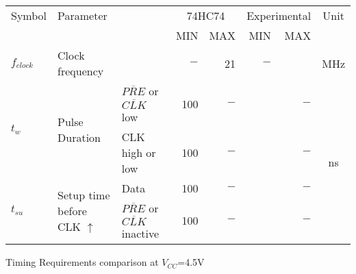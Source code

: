 \begin{tabular}{|l|l|l|r|r|r|r|c|}
    \toprule
    Symbol  &\multicolumn{2}{|l|}{Parameter}&\multicolumn{2}{|c|}{74HC74}&\multicolumn{2}{|c|}{Experimental}&Unit\\
            &\multicolumn{2}{c|}{ }&MIN&MAX&MIN&MAX&\\
    \midrule
    $f_{clock}$&Clock frequency&    &$-$&21&$-$&  &MHz\\
    \hline
    \multirow{2}{*}{$t_{w}$}&\multirow{2}{*}{Pulse Duration}& $\overline{PRE}$ or $\overline{CLK}$ low&100&$-$&  &$-$  &\multirow{4}{*}{ns}\\
        &&CLK high or low&100&$-$&  &$-$  &\\
    \multirow{2}{*}{$t_{su}$}&\multirow{2}{*}{Setup time before CLK $\uparrow$}& Data &100&$-$&  &$-$  &\\
    &&$\overline{PRE}$ or $\overline{CLK}$ inactive&100&$-$&  &$-$  &\\
    \bottomrule
\end{tabular}
\caption{Timing Requirements comparison at $V_{CC}$=4.5V}